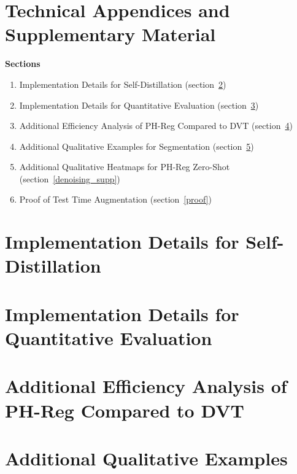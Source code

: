 \appendix
\section{Technical Appendices and Supplementary Material}
\renewcommand\thefigure{S.\arabic{figure}}    
\setcounter{figure}{0}
\renewcommand\thetable{S.\arabic{table}}   
\setcounter{table}{0}

\textbf{\Large Sections}

\begin{enumerate}
    \item Implementation Details for Self-Distillation (section~\ref{distillation})
    \item Implementation Details for Quantitative Evaluation (section~\ref{eval})
    \item Additional Efficiency Analysis of PH-Reg Compared to DVT (section~\ref{efficiency})
    \item Additional Qualitative Examples for Segmentation (section~\ref{additional})
    \item Additional Qualitative Heatmaps for PH-Reg Zero-Shot (section~\ref{denoising_supp})
    \item Proof of Test Time Augmentation  (section~\ref{proof})
\end{enumerate}
\newpage

\vspace{30em}

\section{Implementation Details for Self-Distillation}
\label{distillation}

\clearpage
\section{Implementation Details for Quantitative Evaluation}\label{eval}

\section{Additional Efficiency Analysis of PH-Reg Compared to DVT}\label{efficiency}

\clearpage

\section{Additional Qualitative Examples}
\label{additional}

